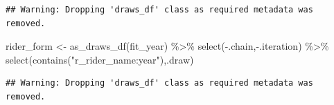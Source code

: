 \documentclass[
]{article}
\newenvironment{Shaded}{\begin{snugshade}}{\end{snugshade}}
\newcommand{\FunctionTok}[1]{\textcolor[rgb]{0.00,0.00,0.00}{#1}}
\newcommand{\NormalTok}[1]{#1}
\newcommand{\OtherTok}[1]{\textcolor[rgb]{0.56,0.35,0.01}{#1}}
\newcommand{\SpecialCharTok}[1]{\textcolor[rgb]{0.00,0.00,0.00}{#1}}
\newcommand{\StringTok}[1]{\textcolor[rgb]{0.31,0.60,0.02}{#1}}
\begin{document}
\begin{verbatim}
## Warning: Dropping 'draws_df' class as required metadata was removed.
\end{verbatim}

\begin{Shaded}
\begin{Highlighting}[]
\NormalTok{rider\_form }\OtherTok{\textless{}{-}} \FunctionTok{as\_draws\_df}\NormalTok{(fit\_year) }\SpecialCharTok{\%\textgreater{}\%} \FunctionTok{select}\NormalTok{(}\SpecialCharTok{{-}}\NormalTok{.chain,}\SpecialCharTok{{-}}\NormalTok{.iteration) }\SpecialCharTok{\%\textgreater{}\%} \FunctionTok{select}\NormalTok{(}\FunctionTok{contains}\NormalTok{(}\StringTok{"r\_rider\_name:year"}\NormalTok{),.draw)}
\end{Highlighting}
\end{Shaded}

\begin{verbatim}
## Warning: Dropping 'draws_df' class as required metadata was removed.
\end{verbatim}
\end{document}
